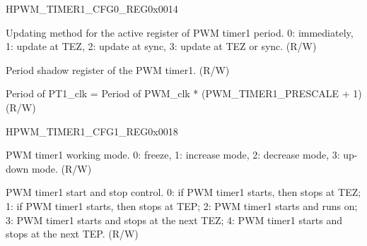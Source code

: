 \begin{register}{H}{PWM\_TIMER1\_CFG0\_REG}{0x0014}\label{regdesc:PWMTIMER1CFG0REG}
%
%
%
%
\regnewline%
\begin{regdesc}\begin{reglist}
\item [PWM\_TIMER1\_PERIOD\_UPMETHOD]Updating method for the active register of PWM timer1 period. 0: immediately, 1: update at TEZ, 2:  update at sync, 3: update at TEZ or sync. (R/W)
\label{regdesc:PWMTIMER1PERIOD} \item [PWM\_TIMER1\_PERIOD]Period shadow register of the PWM timer1. (R/W)
\item [PWM\_TIMER1\_PRESCALE]Period of PT1\_clk = Period of PWM\_clk * (PWM\_TIMER1\_PRESCALE + 1) (R/W)
\end{reglist}\end{regdesc}
\end{register}


\begin{register}{H}{PWM\_TIMER1\_CFG1\_REG}{0x0018}\label{regdesc:PWMTIMER1CFG1REG}
%
%
%
\regnewline%
\begin{regdesc}\begin{reglist}
\item [PWM\_TIMER1\_MOD]PWM timer1 working mode. 0: freeze, 1: increase mode, 2: decrease mode, 3: up-down mode. (R/W)
\item [PWM\_TIMER1\_START]PWM timer1 start and stop control. 0: if PWM timer1 starts, then stops at TEZ; 1: if PWM timer1 starts, then stops at TEP; 2: PWM timer1 starts and runs on; 3: PWM timer1 starts and stops at the next TEZ; 4: PWM timer1 starts and stops at the next TEP. (R/W)
\end{reglist}\end{regdesc}
\end{register}


